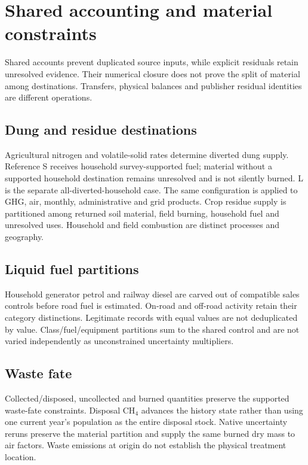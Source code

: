\section{Shared accounting and material constraints}\label{sec:closures}
Shared accounts prevent duplicated source inputs, while explicit residuals retain unresolved evidence. Their numerical closure does not prove the split of material among destinations. Transfers, physical balances and publisher residual identities are different operations.

\subsection{Dung and residue destinations}\label{sec:closure-dung}
Agricultural nitrogen and volatile-solid rates determine diverted dung supply. Reference S receives household survey-supported fuel; material without a supported household destination remains unresolved and is not silently burned. L is the separate all-diverted-household case. The same configuration is applied to GHG, air, monthly, administrative and grid products. Crop residue supply is partitioned among returned soil material, field burning, household fuel and unresolved uses. Household and field combustion are distinct processes and geography.

\subsection{Liquid fuel partitions}\label{sec:closure-generator}\label{sec:closure-offroad}
Household generator petrol and railway diesel are carved out of compatible sales controls before road fuel is estimated. On-road and off-road activity retain their category distinctions. Legitimate records with equal values are not deduplicated by value. Class/fuel/equipment partitions sum to the shared control and are not varied independently as unconstrained uncertainty multipliers.

\subsection{Waste fate}\label{sec:closure-waste}
Collected/disposed, uncollected and burned quantities preserve the supported waste-fate constraints. Disposal CH$_4$ advances the history state rather than using one current year's population as the entire disposal stock. Native uncertainty reruns preserve the material partition and supply the same burned dry mass to air factors. Waste emissions at origin do not establish the physical treatment location.

